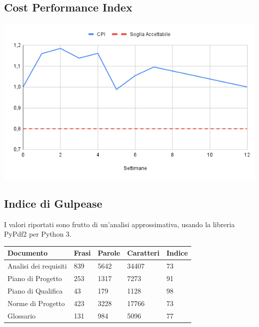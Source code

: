 \documentclass[a4paper, 12pt]{article}
\begin{document}
\subsection{Cost Performance Index}
\begin{center}
	\includegraphics[scale=0.6]{CPI.png}
\end{center}

\subsection*{Indice di Gulpease}
I valori riportati sono frutto di un'analisi approssimativa, usando la libreria PyPdf2 per Python 3.
\begin{center}
	\begin{tabularx}{\textwidth}{|X|X|X|X|X|}
		\hline
		\textbf{Documento} & \textbf{Frasi } & \textbf{Parole } & \textbf{Caratteri } & \textbf{Indice }\\
		\hline
		Analisi dei requisiti &  839                   & 5642 & 34407 & 73                       \\
		\hline
		Piano di Progetto    & 253                     & 1317       & 7273 & 91             \\
		\hline
		Piano di Qualifica    & 43                     & 179       & 1128 &   98             \\
		\hline
		Norme di Progetto    & 423                     & 3228       & 17766 &  73              \\
		\hline
		Glossario    & 131                     		& 984 		& 5096 &    77            \\
		\hline
	\end{tabularx}\\[8pt]
	\mbox{}\\
\end{center}
\end{document}

